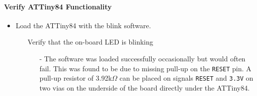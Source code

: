 \paragraph{Verify ATTiny84 Functionality} %
\label{par:verify_attiny84_functionality}
\begin{itemize}
	\item Load the ATTiny84 with the blink software.
	\begin{itemize}
		\item[\xmark] Verify that the on-board LED is blinking
		\begin{itemize}
			\item[-] The software was loaded successfully occasionally but would often fail.
			This was found to be due to missing pull-up on the \texttt{RESET} pin. 
			A pull-up resistor of 3.92k$\Omega$ can be placed on signals \texttt{RESET} and \texttt{3.3V} on two vias on the underside of the board directly under the ATTiny84.
		\end{itemize}
	\end{itemize}
\end{itemize}
